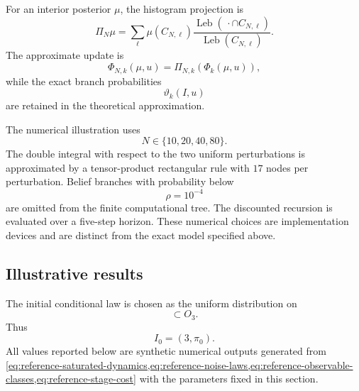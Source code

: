 \documentclass[10pt,twocolumn]{article}
\theoremstyle{remark}
\begin{document}
For an interior posterior \(\mu\), the histogram projection is
\begin{equation*}
	\Pi_N\mu
	=
	\sum_{\ell}
	\mu(C_{N,\ell})
	\frac{
		\operatorname{Leb}(\,\cdot\cap C_{N,\ell})
	}{
		\operatorname{Leb}(C_{N,\ell})
	}.
	\label{eq:reference-histogram-projection}
\end{equation*}
The approximate update is
\begin{equation*}
	\Phi_{N,k}(\mu,u)
	=
	\Pi_{N,k}
	\left(
	\Phi_k(\mu,u)
	\right),
	\label{eq:reference-approximate-filter}
\end{equation*}
while the exact branch probabilities
\[
\vartheta_k(I,u)
\]
are retained in the theoretical approximation.

The numerical illustration uses
\begin{equation*}
	N\in\{10,20,40,80\}.
	\label{eq:reference-resolutions}
\end{equation*}
The double integral with respect to the two uniform perturbations is approximated by a tensor-product rectangular rule with \(17\) nodes per perturbation. Belief branches with probability below
\begin{equation*}
	\rho=10^{-4}
	\label{eq:reference-pruning-threshold}
\end{equation*}
are omitted from the finite computational tree. The discounted recursion is evaluated over a five-step horizon. These numerical choices are implementation devices and are distinct from the exact model specified above.

\subsection{Illustrative results}
\label{subsec:reference-illustrative-results}

The initial conditional law is chosen as the uniform distribution on
\begin{equation*}
	[0.45,0.75]\subset O_3.
	\label{eq:reference-initial-belief}
\end{equation*}
Thus
\[
I_0=(3,\pi_0).
\]
All values reported below are synthetic numerical outputs generated from
\cref{eq:reference-saturated-dynamics,eq:reference-noise-laws,eq:reference-observable-classes,eq:reference-stage-cost}
with the parameters fixed in this section.
\end{document}
